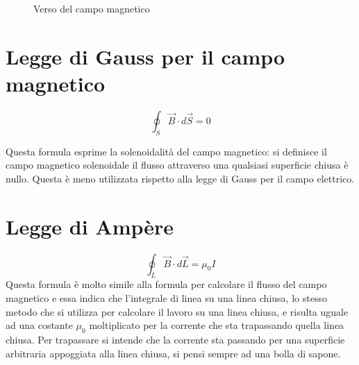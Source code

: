 \begin{figure}[H]
    \caption{Verso del campo magnetico}
    \label{fig:versoCampoiMagnetico}
\end{figure}

\section{Legge di Gauss per il campo magnetico}

\begin{equation}
    \oint_S \vec{B}\cdot d\vec{S} = 0
\end{equation}

Questa formula esprime la solenoidalità del campo magnetico: si definisce il campo magnetico solenoidale il flusso attraverso una qualsiasi superficie chiusa è nullo.
Questa è meno utilizzata rispetto alla legge di Gauss per il campo elettrico.

\section{Legge di Ampère}
\begin{equation}
    \oint_L \vec{B}\cdot d\vec{L} = \mu_0I
\end{equation}
Questa formula è molto simile alla formula per calcolare il flusso del campo magnetico e essa indica che l'integrale di linea su una linea chiusa, lo stesso metodo che si utilizza per calcolare il lavoro su una linea chiusa, e risulta uguale ad una costante $\mu_0$ moltiplicato per la corrente che sta trapassando quella linea chiusa. Per trapassare si intende che la corrente sta passando per una superficie arbitraria appoggiata alla linea chiusa, si pensi sempre ad una bolla di sapone.
